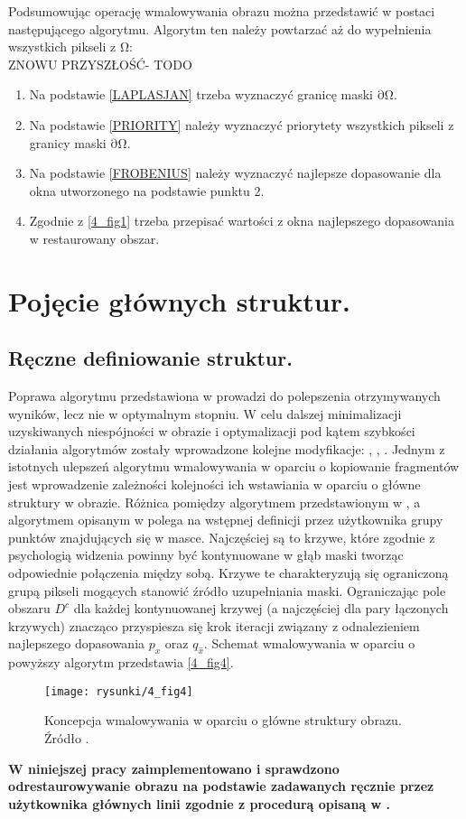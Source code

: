 \documentclass[12pt, twoside, openany]{report}
\theoremstyle{definition}
\begin{document}
Podsumowując operację wmalowywania obrazu można przedstawić w postaci następującego algorytmu. Algorytm ten należy powtarzać aż do wypełnienia wszystkich pikseli z $\mathrm{\Omega }$:
\\ZNOWU PRZYSZŁOŚĆ- TODO
\begin{enumerate}
\item

Na podstawie \eqref{LAPLASJAN} trzeba wyznaczyć granicę maski $\mathrm{\partial }\mathrm{\Omega }$.
\item
Na podstawie \eqref{PRIORITY} należy wyznaczyć priorytety wszystkich pikseli z granicy maski $\mathrm{\partial }\mathrm{\Omega }$.
\item
Na podstawie \eqref{FROBENIUS} należy wyznaczyć najlepsze dopasowanie dla okna utworzonego na podstawie punktu 2.
\item
Zgodnie z \autoref{4_fig1} trzeba przepisać wartości z okna najlepszego dopasowania w restaurowany obszar.
\end{enumerate}
\section{Pojęcie głównych struktur.}
\label{sec:crimMetodSalient}
\subsection{Ręczne definiowanie struktur.}
Poprawa algorytmu przedstawiona w \cite{criminisi2004region} prowadzi do polepszenia otrzymywanych wyników, lecz nie w optymalnym stopniu. W celu dalszej minimalizacji uzyskiwanych niespójności w obrazie i optymalizacji pod kątem szybkości działania algorytmów zostały wprowadzone kolejne modyfikacje: \cite{StructurePropagationManual},  \cite{malluvalasaimplementation}, \cite{SalientStrucTexProp}. 
Jednym z istotnych ulepszeń algorytmu wmalowywania w oparciu o kopiowanie fragmentów jest wprowadzenie zależności kolejności ich wstawiania w oparciu o główne struktury w obrazie.
Różnica pomiędzy algorytmem przedstawionym w \cite{criminisi2004region}, a algorytmem opisanym w \cite{StructurePropagationManual} polega na wstępnej definicji przez użytkownika grupy punktów znajdujących się w masce. Najczęściej są to krzywe, które zgodnie z psychologią widzenia powinny być kontynuowane w głąb maski tworząc odpowiednie połączenia między sobą. Krzywe te charakteryzują się ograniczoną grupą pikseli mogących stanowić źródło uzupełniania maski. Ograniczając pole obszaru $D^c$ dla każdej kontynuowanej krzywej (a najczęściej dla pary łączonych krzywych) znacząco przyspiesza się krok iteracji związany z odnalezieniem najlepszego dopasowania $p_x$ oraz $q_{\hat{x}}$. Schemat wmalowywania w oparciu o powyższy algorytm przedstawia \autoref{4_fig4}.
\begin{figure}[!h]
	\centering
	\texttt{[image: rysunki/4\_fig4]}
	\caption{Koncepcja wmalowywania w oparciu o główne struktury obrazu. Źródło \cite{StructurePropagationManual}.}
	\label{4_fig4} 
\end{figure}
\textbf{W niniejszej pracy zaimplementowano i sprawdzono odrestaurowywanie obrazu na podstawie zadawanych ręcznie przez użytkownika głównych linii zgodnie z procedurą opisaną w  \cite{StructurePropagationManual}.}
\end{document}
